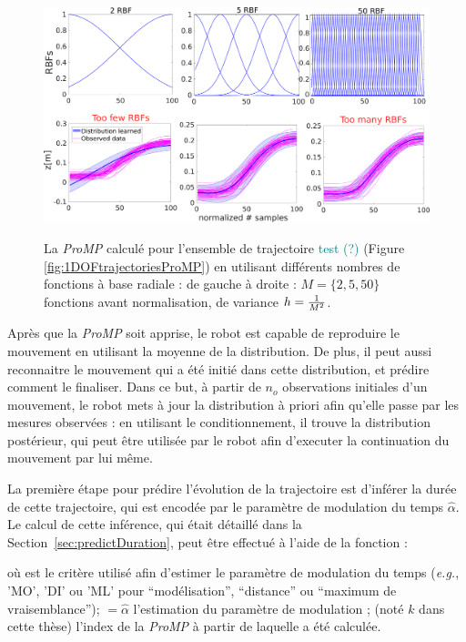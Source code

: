 \documentclass[utf8]{frontiersSCNS} %
\newcommand{\toimprove}[1]{\textcolor{teal}{#1}}
\begin{document}
\begin{figure}[h]
\centering
{
\includegraphics[width=\hsize]{img/1DOFtrajectoriesProMPbasisV4.pdf}
}
\caption{La \textit{ProMP} calculé pour l'ensemble de trajectoire \toimprove{test (?)} (Figure \ref{fig:1DOFtrajectoriesProMP}) en utilisant différents nombres de fonctions à base radiale : de gauche à droite : $M=\{2,5,50\}$ fonctions avant normalisation, de variance $h={1 \over M^2}$. }
\label{fig:1DOFtrajectoriesProMPbasis}
\end{figure}

Après que la \textit{ProMP} soit apprise, le robot est capable de reproduire le mouvement en utilisant la moyenne de la distribution.
De plus, il peut aussi reconnaitre le mouvement qui a été initié dans cette distribution, et prédire comment le finaliser. Dans ce but, à partir de $n_{o}$ observations initiales d'un mouvement, le robot mets à jour la distribution à priori afin qu'elle passe par les mesures observées : en utilisant le conditionnement, il trouve la distribution postérieur, qui peut être utilisée par le robot afin d'executer la continuation du mouvement par lui même.

La première étape pour prédire l'évolution de la trajectoire est d'inférer la durée de cette trajectoire, qui est encodée par le paramètre de modulation du temps $\hat{\alpha}$. Le calcul de cette inférence, qui était détaillé dans la Section~\ref{sec:predictDuration}, peut être effectué à l'aide de la fonction :


où  est le critère utilisé afin d'estimer le paramètre de modulation du temps (\textit{e.g.}, 'MO', 'DI' ou 'ML' pour ``modélisation'', ``distance'' ou ``maximum de vraisemblance'');  $=\hat{\alpha}$ l'estimation du paramètre de modulation ;  (noté $k$ dans cette thèse) l'index de la \textit{ProMP} à partir de laquelle  a été calculée. 
\end{document}
